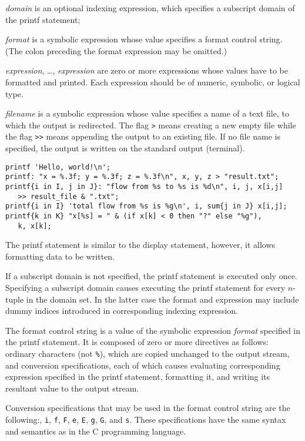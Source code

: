 \documentclass[11pt]{report}
\def\para#1{\noindent{\bf#1}}
\begin{document}
\medskip

\noindent
{\it domain} is an optional indexing expression, which specifies
a subscript domain of the printf statement;

\noindent
{\it format} is a symbolic expression whose value specifies a format
control string. (The colon preceding the format expression may be
omitted.)

\noindent
{\it expression}, \dots, {\it expression} are zero or more expressions
whose values have to be formatted and printed. Each expression should
be of numeric, symbolic, or logical type.

\noindent
{\it filename} is a symbolic expression whose value specifies a name
of a text file, to which the output is redirected. The flag {\tt>}
means creating a new empty file while the flag {\tt>>} means appending
the output to an existing file. If no file name is specified, the
output is written on the standard output (terminal).

\para{Examples}

\begin{verbatim}
printf 'Hello, world!\n';
printf: "x = %.3f; y = %.3f; z = %.3f\n", x, y, z > "result.txt";
printf{i in I, j in J}: "flow from %s to %s is %d\n", i, j, x[i,j]
   >> result_file & ".txt";
printf{i in I} 'total flow from %s is %g\n', i, sum{j in J} x[i,j];
printf{k in K} "x[%s] = " & (if x[k] < 0 then "?" else "%g"),
   k, x[k];
\end{verbatim}

The printf statement is similar to the display statement, however, it
allows formatting data to be written.

If a subscript domain is not specified, the printf statement is
executed only once. Specifying a subscript domain causes executing the
printf statement for every $n$-tuple in the domain set. In the latter
case the format and expression may include dummy indices introduced in
corresponding indexing expression.

The format control string is a value of the symbolic expression
{\it format} specified in the printf statement. It is composed of zero
or more directives as follows: ordinary characters (not {\tt\%}), which
are copied unchanged to the output stream, and conversion
specifications, each of which causes evaluating corresponding
expression specified in the printf statement, formatting it, and
writing its resultant value to the output stream.

Conversion specifications that may be used in the format control string
are the following:, {\tt i}, {\tt f}, {\tt F},
{\tt e}, {\tt E}, {\tt g}, {\tt G}, and {\tt s}. These specifications
have the same syntax and semantics as in the C programming language.
\end{document}
